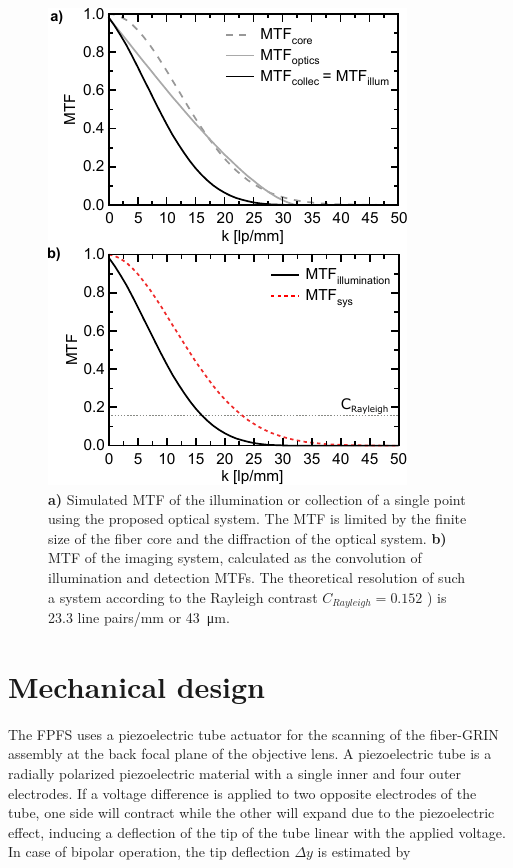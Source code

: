 \documentclass[10pt]{iopart}
\begin{document}
\begin{figure}[h!]\centering \includegraphics{figures/MTFcomplete.pdf}
      \caption{	\textbf{a)} Simulated MTF of the illumination or collection of a single point using the proposed optical system. The MTF is limited by the finite size of the fiber core and the diffraction of the optical system.
				\textbf{b)} MTF of the imaging system, calculated as the convolution of illumination and detection MTFs. The theoretical resolution of such a system according to the Rayleigh contrast $C_{Rayleigh}=0.152$ \cite{Blattmann}) is 23.3 line pairs/mm or \SI{43}{\micro\meter}. }
      \label{fig:MTFcomplete}
\end{figure}

\section{Mechanical design} \label{sec:mech}
The FPFS uses a piezoelectric tube actuator for the scanning of the fiber-GRIN assembly at the back focal plane of the objective lens. A piezoelectric tube is a radially polarized piezoelectric material with a single inner and four outer electrodes. If a voltage difference is applied to two opposite electrodes of the tube, one side will contract while the other will expand due to the piezoelectric effect, inducing a deflection of the tip of the tube linear with the applied voltage. In case of bipolar operation, the tip deflection $\Delta y$ is estimated by \cite{Chen}
\end{document}
